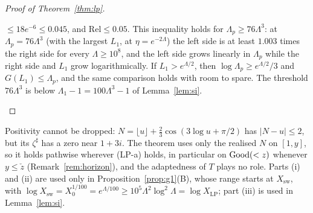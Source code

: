\begin{proof}[Proof of Theorem~\ref{thm:lp}]
\begin{itemize}
  $\le18e^{-6}\le0.045$, and $\mathrm{Rel}\le0.05$. This inequality holds for $\Lambda_p\ge76\Lambda^3$: at $\Lambda_p=76\Lambda^3$ (with the
  largest $L_1$, at $\eta=e^{-2\Lambda}$) the left side is at least $1.003$ times the right side for every $\Lambda\ge10^8$, and the left
  side grows linearly in $\Lambda_p$ while the right side and $L_1$ grow logarithmically. If $L_1>e^{\Lambda/2}$, then
  $\log\Lambda_p\ge e^{\Lambda/2}/3$ and $G(L_1)\le\Lambda_p$, and the same comparison holds with room to spare. The threshold
  $76\Lambda^3$ is below $\Lambda_1-1=100\Lambda^3-1$ of Lemma~\ref{lem:si}.\qedhere
\end{itemize}
\end{proof}

\begin{remark}\label{rem:lp}
Positivity cannot be dropped: $N=\lfloor u\rfloor+\frac23\cos(3\log u+\pi/2)$ has $|N-u|\le2$, but its $\zeta^\sharp$ has a zero
near $1+3i$. The theorem uses only the realised $N$ on $[1,y]$, so it holds pathwise wherever (LP-a) holds, in particular on
$\mathrm{Good}(<z)$ whenever $y\le\check z$ (Remark~\ref{rem:horizon}), and the adaptedness of $T$ plays no role. Parts (i) and (ii)
are used only in Proposition~\ref{prop:g1}(B), whose range starts at $X_{\mathrm{sw}}$, with
$\log X_{\mathrm{sw}}=X_0^{1/100}=e^{\Lambda/100}\ge10^5\Lambda^2\log^2\Lambda=\log X_{\mathrm{LP}}$; part (iii) is used in Lemma~\ref{lem:si}.
\end{remark}
